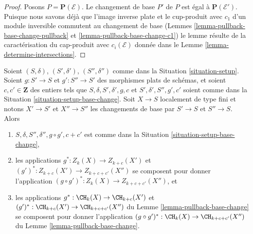 \begin{proof}
Posons $P = \mathbf{P}(\mathcal{E})$. Le changement de base $P'$ de $P$
est égal à $\mathbf{P}(\mathcal{E}')$. Puisque nous savons déjà que
l'image inverse plate et le cup-produit avec $c_1$ d'un module inversible
commutent au changement de base (Lemmes \ref{lemma-pullback-base-change-pullback} et
\ref{lemma-pullback-base-change-c1})
le lemme résulte de la caractérisation du cap-produit
avec $c_i(\mathcal{E})$ donnée dans le Lemme \ref{lemma-determine-intersections}.
\end{proof}

\begin{lemma}
\label{lemma-compose-base-change}
Soient $(S, \delta)$, $(S', \delta')$, $(S'', \delta'')$ comme dans la
Situation \ref{situation-setup}. Soient $g : S' \to S$ et $g' : S'' \to S'$
des morphismes plats de schémas, et soient $c, c' \in \mathbf{Z}$
des entiers tels que $S, \delta, S', \delta', g, c$ et
$S', \delta', S'', g', c'$ soient comme dans la
Situation \ref{situation-setup-base-change}.
Soit $X \to S$ localement de type fini et notons $X' \to S'$
et $X'' \to S''$ les changements de base par $S' \to S$ et $S'' \to S$.
Alors
\begin{enumerate}
\item $S, \delta, S'', \delta'', g \circ g', c + c'$ est comme dans la
Situation \ref{situation-setup-base-change},
\item les applications $g^* : Z_k(X) \to Z_{k + c}(X')$ et
$(g')^* : Z_{k + c}(X') \to Z_{k + c + c'}(X'')$ se
composent pour donner l'application $(g \circ g')^* : Z_k(X) \to Z_{k + c + c'}(X'')$, et
\item les applications $g^* : \CH_k(X) \to \CH_{k + c}(X')$ et
$(g')^* : \CH_{k + c}(X') \to \CH_{k + c + c'}(X'')$ du
Lemme \ref{lemma-pullback-base-change}
se composent pour donner l'application $(g \circ g')^* : \CH_k(X) \to \CH_{k + c + c'}(X'')$
du Lemme \ref{lemma-pullback-base-change}.
\end{enumerate}
\end{lemma}

